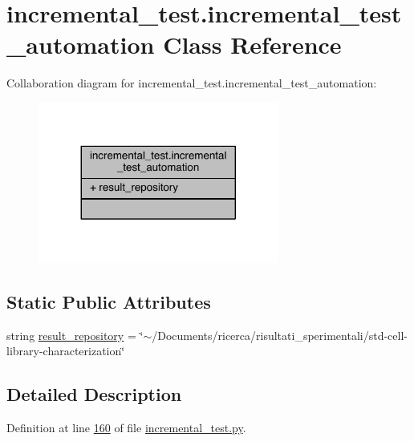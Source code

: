 \hypertarget{classincremental__test_1_1incremental__test__automation}{}\section{incremental\+\_\+test.\+incremental\+\_\+test\+\_\+automation Class Reference}
\label{classincremental__test_1_1incremental__test__automation}


Collaboration diagram for incremental\+\_\+test.\+incremental\+\_\+test\+\_\+automation\+:
\nopagebreak
\begin{figure}[H]
\begin{center}
\leavevmode
\includegraphics[width=224pt]{dc/d3c/classincremental__test_1_1incremental__test__automation__coll__graph}
\end{center}
\end{figure}
\subsection*{Static Public Attributes}
\begin{DoxyCompactItemize}
\item 
string \hyperlink{classincremental__test_1_1incremental__test__automation_afbbdcc0177de0d7d04bbf38ea90e9a5a}{result\+\_\+repository} = \char`\"{}$\sim$/Documents/ricerca/risultati\+\_\+sperimentali/std-\/cell-\/library-\/characterization\char`\"{}
\end{DoxyCompactItemize}


\subsection{Detailed Description}


Definition at line \hyperlink{incremental__test_8py_source_l00160}{160} of file \hyperlink{incremental__test_8py_source}{incremental\+\_\+test.\+py}.




